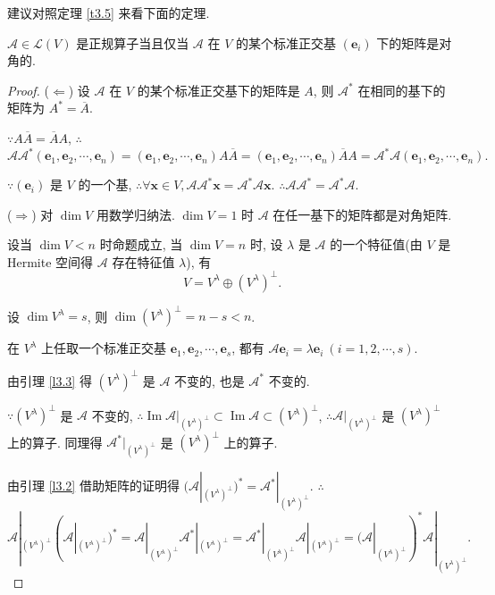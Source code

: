\documentclass{ctexart}
\begin{document}
建议对照定理 \ref{t3.5} 来看下面的定理.
\begin{theorem}[书上的定理 11]\label{t3.7}
    $\mathcal{A}\in\mathcal{L}(V)$ 是正规算子当且仅当 $\mathcal{A}$ 在 $V$ 的某个标准正交基 $(\boldsymbol{e}_i)$ 下的矩阵是对角的.
\end{theorem}
\begin{proof}
    ($\Leftarrow$) 设 $\mathcal{A}$ 在 $V$ 的某个标准正交基下的矩阵是 $A$, 则 $\mathcal{A}^*$ 在相同的基下的矩阵为 $A^*=\overline{A}$.
    
    $\because A\overline{A}=\overline{A}A$, $\therefore$
    \[\mathcal{A}\mathcal{A}^*(\boldsymbol{e}_1,\boldsymbol{e}_2,\cdots,\boldsymbol{e}_n)=(\boldsymbol{e}_1,\boldsymbol{e}_2,\cdots,\boldsymbol{e}_n)A\overline{A}=(\boldsymbol{e}_1,\boldsymbol{e}_2,\cdots,\boldsymbol{e}_n)\overline{A}A=\mathcal{A}^*\mathcal{A}(\boldsymbol{e}_1,\boldsymbol{e}_2,\cdots,\boldsymbol{e}_n).\]

    $\because(\boldsymbol{e}_i)$ 是 $V$ 的一个基, $\therefore\forall\boldsymbol{x}\in V,\mathcal{A}\mathcal{A}^*\boldsymbol{x}=\mathcal{A}^*\mathcal{A}\boldsymbol{x}$. $\therefore\mathcal{A}\mathcal{A}^*=\mathcal{A}^*\mathcal{A}$.

    ($\Rightarrow$) 对 $\dim V$ 用数学归纳法. $\dim V=1$ 时 $\mathcal{A}$ 在任一基下的矩阵都是对角矩阵.

    设当 $\dim V<n$ 时命题成立, 当 $\dim V=n$ 时, 设 $\lambda$ 是 $\mathcal{A}$ 的一个特征值(由 $V$ 是 Hermite 空间得 $\mathcal{A}$ 存在特征值 $\lambda$), 有
    \[V=V^\lambda\oplus(V^\lambda)^\perp.\]

    设 $\dim V^\lambda=s$, 则 $\dim(V^\lambda)^\perp=n-s<n$.

    在 $V^\lambda$ 上任取一个标准正交基 $\boldsymbol{e}_1,\boldsymbol{e}_2,\cdots,\boldsymbol{e}_s$, 都有 $\mathcal{A}\boldsymbol{e}_i=\lambda\boldsymbol{e}_i\ (i=1,2,\cdots,s)$.

    由引理 \ref{l3.3} 得 $(V^\lambda)^\perp$ 是 $\mathcal{A}$ 不变的, 也是 $\mathcal{A}^*$ 不变的.

    $\because(V^\lambda)^\perp$ 是 $\mathcal{A}$ 不变的, $\therefore\operatorname{Im}\mathcal{A}|_{(V^\lambda)^\perp}\subset\operatorname{Im}\mathcal{A}\subset(V^\lambda)^\perp$, $\therefore\mathcal{A}|_{(V^\lambda)^\perp}$ 是 $(V^\lambda)^\perp$ 上的算子. 同理得 $\mathcal{A}^*|_{(V^\lambda)^\perp}$ 是 $(V^\lambda)^\perp$ 上的算子.

    由引理 \ref{l3.2} 借助矩阵的证明得 $(\mathcal{A}|_{(V^\lambda)^\perp})^*=\mathcal{A}^*|_{(V^\lambda)^\perp}$. $\therefore$
    \[\mathcal{A}|_{(V^\lambda)^\perp}(\mathcal{A}|_{(V^\lambda)^\perp})^*=\mathcal{A}|_{(V^\lambda)^\perp}\mathcal{A}^*|_{(V^\lambda)^\perp}=\mathcal{A}^*|_{(V^\lambda)^\perp}\mathcal{A}|_{(V^\lambda)^\perp}=(\mathcal{A}|_{(V^\lambda)^\perp})^*\mathcal{A}|_{(V^\lambda)^\perp}.\]


\end{proof}
\end{document}
